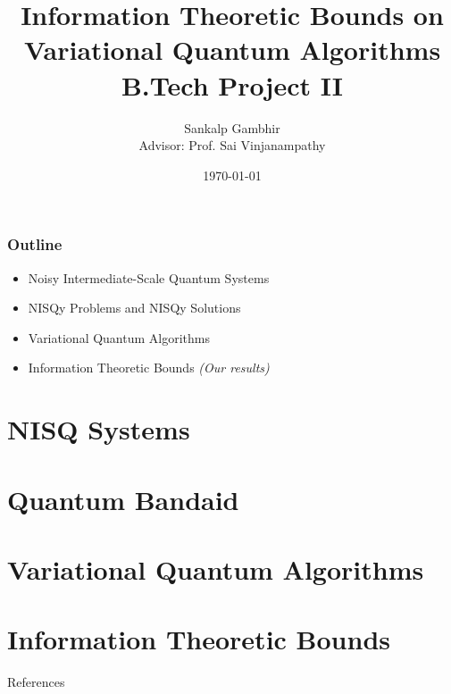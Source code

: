 \documentclass[
    aspectratio=169,
    xcolor={dvipsnames},
]
{beamer}
\title{
    {\huge Information Theoretic Bounds on Variational Quantum Algorithms} \\
    {\large B.Tech Project II}
    }
\author[sgambhir@iitb.ac.in]{
    Sankalp Gambhir \\ 
    \vspace{1em}
        {
            \normalsize 
            \hspace{0.1em} 
            Advisor:
            Prof. Sai Vinjanampathy
        }
    \vspace{-1.3em}
}
\date{\today}
\begin{document}
    \maketitle

    \begin{frame}
        \frametitle{Outline}
    
        \begin{itemize}
            \item Noisy Intermediate-Scale Quantum Systems
            \item NISQy Problems and NISQy Solutions
            \item Variational Quantum Algorithms
            \item Information Theoretic Bounds \emph{(Our results)}
        \end{itemize}
    
    \end{frame}


    \section{NISQ Systems}
    

    \section{Quantum Bandaid}
    


    \section{Variational Quantum Algorithms}
    


    \section{Information Theoretic Bounds}
    

    \begin{frame}{References}
        \printbibliography
    \end{frame}
\end{document}
